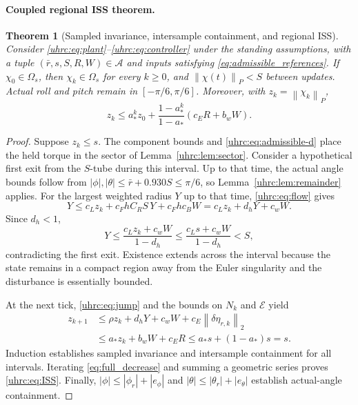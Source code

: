 \documentclass[12pt, a4paper]{article}
\newtheorem{theorem}{Theorem}
\begin{document}
\paragraph{Coupled regional ISS theorem.}
\label{uhrc:sec:ISS}

\begin{theorem}[Sampled invariance, intersample containment, and regional ISS]
\label{thm:cascade_iss}
Consider \eqref{uhrc:eq:plant}--\eqref{uhrc:eq:controller} under the standing
assumptions, with a tuple $(\bar r,s,S,R,W)\in\mathcal A$ and inputs satisfying
\eqref{eq:admissible_references}. If $\chi_0\in\Omega_s$, then
$\chi_k\in\Omega_s$ for every $k\ge0$, and
$\left\lVert \chi(t)\right\rVert_{P}<S$ between updates. Actual roll and pitch remain in
$[-\pi/6,\pi/6]$. Moreover, with $z_k=\left\lVert \chi_k\right\rVert_{P}$,
\begin{equation}
 z_k\le a_*^kz_0+
 \frac{1-a_*^k}{1-a_*}(c_ER+b_wW).
 \label{uhrc:eq:ISS}
\end{equation}
\end{theorem}
\begin{proof}
Suppose $z_k\le s$. The component bounds and
\eqref{uhrc:eq:admissible-d} place the held torque in the sector of
Lemma~\ref{uhrc:lem:sector}. Consider a hypothetical first exit from the
$S$-tube during this interval. Up to that time, the actual angle bounds
follow from $|\phi|,|\theta|\le\bar r+0.930S\le\pi/6$, so
Lemma~\ref{uhrc:lem:remainder} applies.
For the largest weighted radius $Y$ up to that time,
\eqref{uhrc:eq:flow} gives
\begin{equation}
 Y\le c_Lz_k+c_FhC_RS\,Y+c_Fhc_BW
   =c_Lz_k+d_hY+c_wW.
 \label{uhrc:eq:intersample-comparison}
\end{equation}
Since $d_h<1$,
\[
 Y\le\frac{c_Lz_k+c_wW}{1-d_h}
 \le\frac{c_Ls+c_wW}{1-d_h}<S,
\]
contradicting the first exit. Existence extends across the interval because
the state remains in a compact region away from the Euler singularity and
the disturbance is essentially bounded.

At the next tick, \eqref{uhrc:eq:jump} and the bounds on $N_k$ and
$\mathcal E$ yield
\begin{align}
 z_{k+1}
 &\le\rho z_k+d_hY+c_wW+c_E\left\lVert \delta\eta_{r,k}\right\rVert_{2}\nonumber\\
 &\le a_*z_k+b_wW+c_ER
 \le a_*s+(1-a_*)s=s.
 \label{eq:full_decrease}
\end{align}
Induction establishes sampled invariance and intersample containment for
all intervals. Iterating \eqref{eq:full_decrease} and summing a geometric
series proves \eqref{uhrc:eq:ISS}. Finally,
$|\phi|\le|\phi_r|+|e_\phi|$ and
$|\theta|\le|\theta_r|+|e_\theta|$ establish actual-angle containment.
\end{proof}
\end{document}
